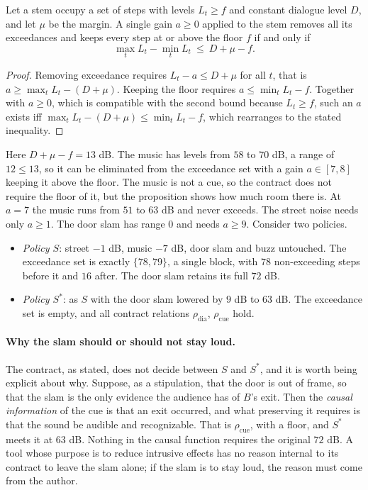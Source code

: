 \begin{proposition}\label{prop:stemwise}
Let a stem occupy a set of steps with levels $L_t\ge f$ and constant dialogue level $D$, and let $\mu$ be the margin. A single gain $a\ge0$ applied to the stem removes all its exceedances and keeps every step at or above the floor $f$ if and only if
\[
\max_tL_t-\min_tL_t\ \le\ D+\mu-f .
\]
\end{proposition}

\begin{proof}
Removing exceedance requires $L_t-a\le D+\mu$ for all $t$, that is $a\ge\max_tL_t-(D+\mu)$. Keeping the floor requires $a\le\min_tL_t-f$. Together with $a\ge0$, which is compatible with the second bound because $L_t\ge f$, such an $a$ exists iff $\max_tL_t-(D+\mu)\le\min_tL_t-f$, which rearranges to the stated inequality.
\end{proof}

Here $D+\mu-f=13$ dB. The music has levels from $58$ to $70$ dB, a range of $12\le13$, so it can be eliminated from the exceedance set with a gain $a\in[7,8]$ keeping it above the floor. The music is not a cue, so the contract does not require the floor of it, but the proposition shows how much room there is. At $a=7$ the music runs from $51$ to $63$ dB and never exceeds. The street noise needs only $a\ge1$. The door slam has range $0$ and needs $a\ge9$. Consider two policies.
\begin{itemize}
\item \emph{Policy $S$}: street $-1$ dB, music $-7$ dB, door slam and buzz untouched. The exceedance set is exactly $\{78,79\}$, a single block, with $78$ non-exceeding steps before it and $16$ after. The door slam retains its full $72$ dB.
\item \emph{Policy $S^*$}: as $S$ with the door slam lowered by $9$ dB to $63$ dB. The exceedance set is empty, and all contract relations $\rho_{\mathrm{dia}}$, $\rho_{\mathrm{cue}}$ hold.
\end{itemize}
\paragraph{Why the slam should or should not stay loud.} The contract, as stated, does not decide between $S$ and $S^*$, and it is worth being explicit about why. Suppose, as a stipulation, that the door is out of frame, so that the slam is the only evidence the audience has of $B$'s exit. Then the \emph{causal information} of the cue is that an exit occurred, and what preserving it requires is that the sound be audible and recognizable. That is $\rho_{\mathrm{cue}}$, with a floor, and $S^*$ meets it at $63$ dB. Nothing in the causal function requires the original $72$ dB. A tool whose purpose is to reduce intrusive effects has no reason internal to its contract to leave the slam alone; if the slam is to stay loud, the reason must come from the author.

